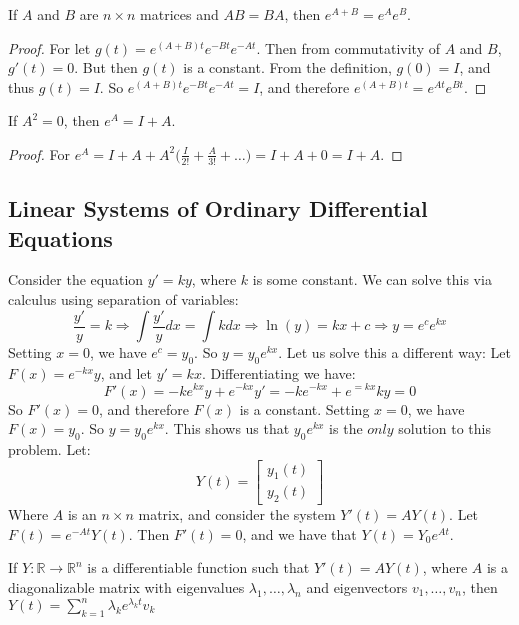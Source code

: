 \documentclass[../main.tex]{subfiles}
\begin{document}
%
\begin{theorem}
If $A$ and $B$ are $n\times n$ matrices and $AB=BA$, then $e^{A+B} = e^{A}e^{B}$.
\end{theorem}
\begin{proof}
For let $g(t) = e^{(A+B)t}e^{-Bt}e^{-At}$. Then from commutativity of $A$ and $B$, $g'(t) = 0$. But then $g(t)$ is a constant. From the definition, $g(0) = I$, and thus $g(t) = I$. So $e^{(A+B)t}e^{-Bt}e^{-At} = I$, and therefore $e^{(A+B)t} = e^{At}e^{Bt}$.
\end{proof}
%
\begin{theorem}
If $A^{2} = 0$, then $e^{A} = I+A$.
\end{theorem}
\begin{proof}
For $e^{A} = I+A+A^{2}\big(\frac{I}{2!}+\frac{A}{3!}+\hdots\big) = I+A+0 = I+A$.
\end{proof}
%
\subsection{Linear Systems of Ordinary Differential Equations}
%
Consider the equation $y' = ky$, where $k$ is some constant. We can solve this via calculus using separation of variables:
\begin{equation*}
    \frac{y'}{y} = k\Rightarrow \int \frac{y'}{y}dx = \int kdx \Rightarrow \ln(y) = kx+c \Rightarrow y = e^c e^{kx}    
\end{equation*}
Setting $x=0$, we have $e^c = y_0$. So $y = y_0e^{kx}$. Let us solve this a different way: Let $F(x) = e^{-kx}y$, and let $y'=kx$. Differentiating we have:
\begin{equation*}
    F'(x) = -ke^{kx}y + e^{-kx}y' = -ke^{-kx}+e^{=kx}ky = 0    
\end{equation*}
So $F'(x) = 0$, and therefore $F(x)$ is a constant. Setting $x=0$, we have $F(x) = y_0$. So $y = y_0e^{kx}$. This shows us that $y_0e^{kx}$ is the $only$ solution to this problem. Let:
\begin{equation*}
    Y(t) = \begin{bmatrix} y_1(t) \\ y_2(t)\end{bmatrix}    
\end{equation*}
Where $A$ is an $n\times n$ matrix, and consider the system $Y'(t) = AY(t)$. Let $F(t) = e^{-At}Y(t)$. Then $F'(t) = 0$, and we have that $Y(t) = Y_0 e^{At}$.
%
\begin{theorem}
If $Y:\mathbb{R}\rightarrow \mathbb{R}^n$ is a differentiable function such that $Y'(t) = AY(t)$, where $A$ is a diagonalizable matrix with eigenvalues $\lambda_1,\hdots, \lambda_n$ and eigenvectors $v_1,\hdots, v_n$, then $Y(t) = \sum_{k=1}^{n} \lambda_k e^{\lambda_k t}v_k$
\end{theorem}
\end{document}
